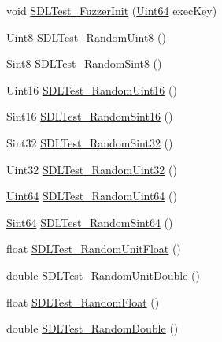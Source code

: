 \begin{DoxyCompactItemize}
\item 
void \hyperlink{i686-w64-mingw32_2include_2SDL2_2SDL__test__fuzzer_8h_a623db129ea615326bed457ebb9703c1e}{S\+D\+L\+Test\+\_\+\+Fuzzer\+Init} (\hyperlink{structUint64}{Uint64} exec\+Key)
\item 
Uint8 \hyperlink{i686-w64-mingw32_2include_2SDL2_2SDL__test__fuzzer_8h_af942b620c7418ec3d47a0610b94e8337}{S\+D\+L\+Test\+\_\+\+Random\+Uint8} ()
\item 
Sint8 \hyperlink{i686-w64-mingw32_2include_2SDL2_2SDL__test__fuzzer_8h_acf54a1586a83ad3f4873e0111d0202e7}{S\+D\+L\+Test\+\_\+\+Random\+Sint8} ()
\item 
Uint16 \hyperlink{i686-w64-mingw32_2include_2SDL2_2SDL__test__fuzzer_8h_a98beae757a943595d32aafee88cc4da1}{S\+D\+L\+Test\+\_\+\+Random\+Uint16} ()
\item 
Sint16 \hyperlink{i686-w64-mingw32_2include_2SDL2_2SDL__test__fuzzer_8h_ae1be2df94dde429c7fe936e2a4efea39}{S\+D\+L\+Test\+\_\+\+Random\+Sint16} ()
\item 
Sint32 \hyperlink{i686-w64-mingw32_2include_2SDL2_2SDL__test__fuzzer_8h_ac67535fd617b059fccc8ddb52e34aed0}{S\+D\+L\+Test\+\_\+\+Random\+Sint32} ()
\item 
Uint32 \hyperlink{i686-w64-mingw32_2include_2SDL2_2SDL__test__fuzzer_8h_a815bd0547ea1c3bed6a60ae4e96cd597}{S\+D\+L\+Test\+\_\+\+Random\+Uint32} ()
\item 
\hyperlink{structUint64}{Uint64} \hyperlink{i686-w64-mingw32_2include_2SDL2_2SDL__test__fuzzer_8h_a5d08f09338fb5f8e4b67a5d7e67231fd}{S\+D\+L\+Test\+\_\+\+Random\+Uint64} ()
\item 
\hyperlink{structUint64}{Sint64} \hyperlink{i686-w64-mingw32_2include_2SDL2_2SDL__test__fuzzer_8h_ae7e7c4c94ce61cc6f8fe6bc976662de0}{S\+D\+L\+Test\+\_\+\+Random\+Sint64} ()
\item 
float \hyperlink{i686-w64-mingw32_2include_2SDL2_2SDL__test__fuzzer_8h_a185df1c7d2cf7af44119bc9b87310b29}{S\+D\+L\+Test\+\_\+\+Random\+Unit\+Float} ()
\item 
double \hyperlink{i686-w64-mingw32_2include_2SDL2_2SDL__test__fuzzer_8h_af48d4a95e2f80651b8c7200fb4d0b671}{S\+D\+L\+Test\+\_\+\+Random\+Unit\+Double} ()
\item 
float \hyperlink{i686-w64-mingw32_2include_2SDL2_2SDL__test__fuzzer_8h_ac67cbb94c2868d3ee7aaeddc5c01705f}{S\+D\+L\+Test\+\_\+\+Random\+Float} ()
\item 
double \hyperlink{i686-w64-mingw32_2include_2SDL2_2SDL__test__fuzzer_8h_ac6f2dff59dec57742c4fe1ed47aaac8f}{S\+D\+L\+Test\+\_\+\+Random\+Double} ()

\end{DoxyCompactItemize}
